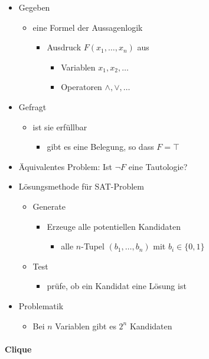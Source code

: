 \documentclass{scrartcl}
\begin{document}
\begin{itemize}
	\item Gegeben
	\begin{itemize}
		\item eine Formel der Aussagenlogik
		\begin{itemize}
			\item Ausdruck $F(x_1,\ldots,x_n)$ aus
			\begin{itemize}
				\item Variablen $x_1,x_2,\ldots$
				\item Operatoren $\wedge, \vee, \ldots$
			\end{itemize}
		\end{itemize}
	\end{itemize}
	\item Gefragt
	\begin{itemize}
		\item ist sie erfüllbar
		\begin{itemize}
			\item gibt es eine Belegung, so dass $F=\top$
		\end{itemize}
	\end{itemize}
	\item Äquivalentes Problem: Ist $\lnot F$ eine Tautologie?
	\item Lösungsmethode für SAT-Problem
	\begin{itemize}
		\item Generate
		\begin{itemize}
			\item Erzeuge alle potentiellen Kandidaten
			\begin{itemize}
				\item alle $n$-Tupel $(b_1,\ldots,b_n)$ mit $b_i \in \{ 0,1 \}$
			\end{itemize}
		\end{itemize}
		\item Test
		\begin{itemize}
			\item prüfe, ob ein Kandidat eine Lösung ist
		\end{itemize}
	\end{itemize}
	\item Problematik
	\begin{itemize}
		\item Bei $n$ Variablen gibt es $2^n$ Kandidaten
	\end{itemize}
\end{itemize}

\paragraph{Clique}
\end{document}
